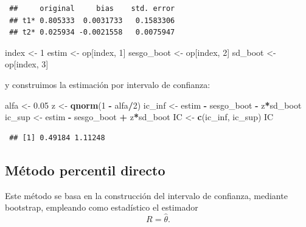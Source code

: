 \documentclass[
  spanish,
  10pt,
]{book}
\newenvironment{Shaded}{\begin{snugshade}}{\end{snugshade}}
\newcommand{\DecValTok}[1]{\textcolor[rgb]{0.00,0.00,0.81}{#1}}
\newcommand{\FloatTok}[1]{\textcolor[rgb]{0.00,0.00,0.81}{#1}}
\newcommand{\FunctionTok}[1]{\textcolor[rgb]{0.13,0.29,0.53}{\textbf{#1}}}
\newcommand{\NormalTok}[1]{#1}
\newcommand{\OtherTok}[1]{\textcolor[rgb]{0.56,0.35,0.01}{#1}}
\newcommand{\SpecialCharTok}[1]{\textcolor[rgb]{0.81,0.36,0.00}{\textbf{#1}}}
\theoremstyle{break}
\theoremstyle{nonumberplain}
\begin{document}
\begin{verbatim}
 ##     original     bias    std. error
 ## t1* 0.805333  0.0031733   0.1583306
 ## t2* 0.025934 -0.0021558   0.0075947
\end{verbatim}

\begin{Shaded}
\begin{Highlighting}[]
\NormalTok{index }\OtherTok{\textless{}{-}} \DecValTok{1}
\NormalTok{estim }\OtherTok{\textless{}{-}}\NormalTok{ op[index, }\DecValTok{1}\NormalTok{]}
\NormalTok{sesgo\_boot }\OtherTok{\textless{}{-}}\NormalTok{ op[index, }\DecValTok{2}\NormalTok{]}
\NormalTok{sd\_boot }\OtherTok{\textless{}{-}}\NormalTok{ op[index, }\DecValTok{3}\NormalTok{]}
\end{Highlighting}
\end{Shaded}

y construimos la estimación por intervalo de confianza:

\begin{Shaded}
\begin{Highlighting}[]
\NormalTok{alfa }\OtherTok{\textless{}{-}} \FloatTok{0.05}
\NormalTok{z }\OtherTok{\textless{}{-}} \FunctionTok{qnorm}\NormalTok{(}\DecValTok{1} \SpecialCharTok{{-}}\NormalTok{ alfa}\SpecialCharTok{/}\DecValTok{2}\NormalTok{)}
\NormalTok{ic\_inf }\OtherTok{\textless{}{-}}\NormalTok{ estim }\SpecialCharTok{{-}}\NormalTok{ sesgo\_boot }\SpecialCharTok{{-}}\NormalTok{ z}\SpecialCharTok{*}\NormalTok{sd\_boot}
\NormalTok{ic\_sup }\OtherTok{\textless{}{-}}\NormalTok{ estim }\SpecialCharTok{{-}}\NormalTok{ sesgo\_boot }\SpecialCharTok{+}\NormalTok{ z}\SpecialCharTok{*}\NormalTok{sd\_boot}
\NormalTok{IC }\OtherTok{\textless{}{-}} \FunctionTok{c}\NormalTok{(ic\_inf, ic\_sup)}
\NormalTok{IC}
\end{Highlighting}
\end{Shaded}

\begin{verbatim}
 ## [1] 0.49184 1.11248
\end{verbatim}

\subsection{Método percentil directo}\label{boot-ic-perc}

Este método se basa en la construcción del intervalo de confianza, mediante bootstrap, empleando como estadístico el estimador \[R = \hat{\theta}.\]
\end{document}
